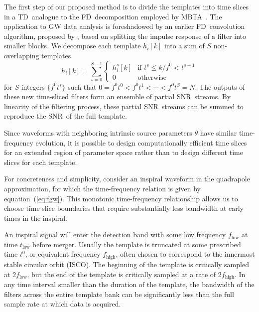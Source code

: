 \documentclass[preprint2]{aastex}
\newcommand{\ISCO}{ISCO}%
\newcommand{\SNR}{SNR}%
\newcommand{\TD}{TD}%
\newcommand{\FD}{FD}%
\begin{document}
The first step of our proposed method is to divide the templates into time
slices in a \TD\ analogue to the \FD\ decomposition employed by MBTA~\citep{Marion2004,Buskulic2010}.  The application to GW data analysis is foreshadowed by an earlier \FD\ convolution algorithm, proposed by \citet{gardner1995efficient}, based on splitting the impulse response of a filter into smaller blocks.  We decompose each template
$h_{i}[k]$ into a sum of $S$ non-overlapping templates
%
\begin{equation}
\label{eq:time-slices}
h_{i}[k] = \sum_{s=0}^{S-1}
	\begin{cases}
		h_i^s[k] & \textrm{if } t^s \leqslant k / f^0 < t^{s+1} \\
		0 & \textrm{otherwise}
	\end{cases}
\end{equation}
%
for $S$ integers $\{f^0 t^s\}$ such that $0  = f^0 t^0 < f^0 t^1 < \cdots < f^0
t^S = N$.  The outputs of these new time-sliced filters
form an ensemble of partial \SNR\ streams.  By linearity of the filtering
process, these partial \SNR\ streams can be summed to reproduce the
\SNR\ of the full template.

Since waveforms with neighboring intrinsic source parameters $\theta$
 have similar time-frequency evolution, it is possible to design computationally
efficient time slices for an extended region of parameter space rather than to
design different time slices for each template.

For concreteness and simplicity, consider an inspiral waveform in the
quadrapole approximation, for which the time-frequency relation is given by equation~(\ref{eq:fgw}).
This monotonic time-frequency relationship allows us
to choose time slice boundaries that require substantially less bandwidth at
early times in the inspiral.

An inspiral signal will enter the detection band with some low frequency
$f_\mathrm{low}$ at time $t_\mathrm{low}$ before merger.  Usually the template
is truncated at some prescribed time $t^0$, or equivalent frequency $f_\mathrm{high}$,
often chosen to correspond to the innermost stable circular orbit (\ISCO). The beginning of the template is critically
sampled at $2 f_\mathrm{low}$, but the end of the template is critically sampled at a
rate of $2 f_\mathrm{high}$. In any time interval smaller than the duration of the template,
the bandwidth of the filters across the entire template bank can be significantly less
than the full sample rate at which data is acquired.
\end{document}
